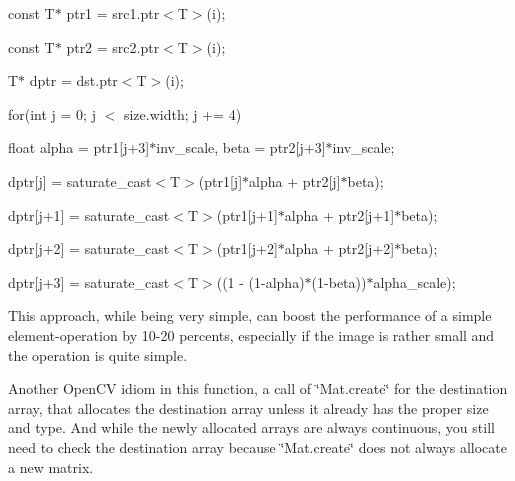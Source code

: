 {\ttfamily }

{\ttfamily }

{\ttfamily const T$\ast$ ptr1 = src1.\+ptr$<$\+T$>$(i);}

{\ttfamily }

{\ttfamily }

{\ttfamily const T$\ast$ ptr2 = src2.\+ptr$<$\+T$>$(i);}

{\ttfamily }

{\ttfamily }

{\ttfamily T$\ast$ dptr = dst.\+ptr$<$\+T$>$(i);}

{\ttfamily }

{\ttfamily }

{\ttfamily for(int j = 0; j $<$ size.\+width; j += 4)}

{\ttfamily }

{\ttfamily }

{\ttfamily float alpha = ptr1\mbox{[}j+3\mbox{]}$\ast$inv\+\_\+scale, beta = ptr2\mbox{[}j+3\mbox{]}$\ast$inv\+\_\+scale;}

{\ttfamily }

{\ttfamily }

{\ttfamily dptr\mbox{[}j\mbox{]} = saturate\+\_\+cast$<$\+T$>$(ptr1\mbox{[}j\mbox{]}$\ast$alpha + ptr2\mbox{[}j\mbox{]}$\ast$beta);}

{\ttfamily }

{\ttfamily }

{\ttfamily dptr\mbox{[}j+1\mbox{]} = saturate\+\_\+cast$<$\+T$>$(ptr1\mbox{[}j+1\mbox{]}$\ast$alpha + ptr2\mbox{[}j+1\mbox{]}$\ast$beta);}

{\ttfamily }

{\ttfamily }

{\ttfamily dptr\mbox{[}j+2\mbox{]} = saturate\+\_\+cast$<$\+T$>$(ptr1\mbox{[}j+2\mbox{]}$\ast$alpha + ptr2\mbox{[}j+2\mbox{]}$\ast$beta);}

{\ttfamily }

{\ttfamily }

{\ttfamily dptr\mbox{[}j+3\mbox{]} = saturate\+\_\+cast$<$\+T$>$((1 -\/ (1-\/alpha)$\ast$(1-\/beta))$\ast$alpha\+\_\+scale);}

{\ttfamily }

{\ttfamily }

{\ttfamily This approach, while being very simple, can boost the performance of a simple element-\/operation by 10-\/20 percents, especially if the image is rather small and the operation is quite simple. }

Another Open\+CV idiom in this function, a call of \char`\"{}\+Mat.\+create\char`\"{} for the destination array, that allocates the destination array unless it already has the proper size and type. And while the newly allocated arrays are always continuous, you still need to check the destination array because \char`\"{}\+Mat.\+create\char`\"{} does not always allocate a new matrix.

